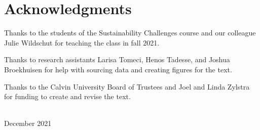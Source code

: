 \clearpage




\blankpage

\chapter*{Acknowledgments}
\thispagestyle{plain}

\noindent
Thanks to the students of the Sustainability Challenges course and our colleague 
Julie Wildschut for teaching the class in fall 2021.

Thanks to research assistants Larisa Tomeci, Henos Tadesse, and Joshua Broekhuisen
for help with sourcing data and creating figures for the text. 

Thanks to the Calvin University Board of Trustees and Joel and Linda Zylstra
for funding to create and revise the text.

\vspace*{2pc}
\noindent\AUTHORS\\
\noindent December 2021
 
\clearpage

\blankpage

